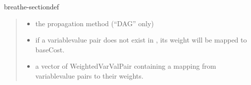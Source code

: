 \documentclass[letterpaper,10pt,openany,oneside,english]{sphinxmanual}
\begin{document}
\begin{fulllineitems}
\begin{sphinxuseclass}{breathe-sectiondef}
\begin{fulllineitems}
\begin{quote}
\begin{description}
\begin{itemize}
\item {} 
\sphinxAtStartPar
{} \textendash{} the propagation method (“DAG” only) 

\item {} 
\sphinxAtStartPar
{} \textendash{} if a variable\sphinxhyphen{}value pair does not exist in , its weight will be mapped to baseCost. 

\item {} 
\sphinxAtStartPar
{} \textendash{} a vector of WeightedVarValPair containing a mapping from variable\sphinxhyphen{}value pairs to their weights. 

\end{itemize}

\end{description}\end{quote}

\end{fulllineitems}



\end{sphinxuseclass}
\end{fulllineitems}
\end{document}
